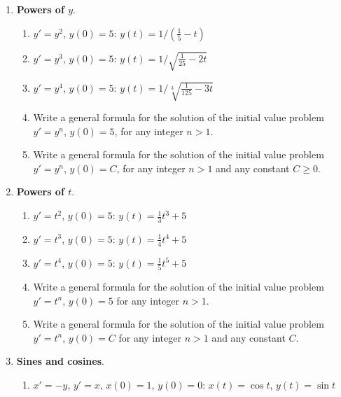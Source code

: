 \begin{enumerate}
\item {\bf Powers of $y$}.

  \begin{enumerate}
  \item $y'=y^2$, $y(0)=5$: \quad $y(t)= 1/(\frac{1}{5} - t)$


  \item $y'=y^3$, $y(0)=5$:   \quad $y(t) = 1/\sqrt{\frac{1}{25} - 2t}$


  \item $y'=y^4$, $y(0)=5$:  \quad $y(t) =  1/\sqrt[3]{\frac{1}{125} - 3t}$


  \item Write a general formula for the solution of the initial value problem $y'=y^n$, $y(0)=5$, for any integer $n > 1$.

  \item Write a general formula for the solution of the initial value problem $y'=y^n$, $y(0)=C$, for any integer $n > 1$ and any constant $C\geq 0$.



\end{enumerate}
\item {\bf Powers of $t$}.

  \begin{enumerate}
  \item $y'=t^2$, $y(0)=5$:  \quad $y(t) = \frac{1}{3}t^3 + 5$


  \item $y'=t^3$, $y(0)=5$:  \quad $y(t) = \frac{1}{4}t^4 + 5$


  \item $y'=t^4$, $y(0)=5$:  \quad $y(t) = \frac{1}{5}t^5 + 5$


  \item Write a general formula for the solution of the initial value problem $y'=t^n$, $y(0)=5$ for any integer $n > 1$.

  \item Write a general formula for the solution of the initial value problem $y'=t^n$, $y(0)=C$ for any integer $n > 1$ and any constant $C$.



\end{enumerate}
\item {\bf Sines and cosines}.

  \begin{enumerate}
  \item $x'=-y$, $y'=x$, $x(0)=1$, $y(0)=0$: \quad $x(t)=\cos t$, $y(t) = \sin t$



\end{enumerate}
\end{enumerate}
